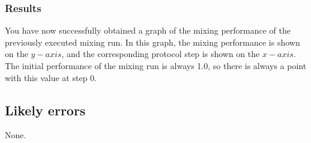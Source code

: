 \subsubsection{Results}
You have now successfully obtained a graph of the mixing performance of the previously executed mixing run. In this graph, the mixing performance is shown on the $y-axis$, and the corresponding protocol step is shown on the $x-axis$. The initial performance of the mixing run is always 1.0, so there is always a point with this value at step 0.

\subsection{Likely errors}
None.


%
%
%
%
%
%
